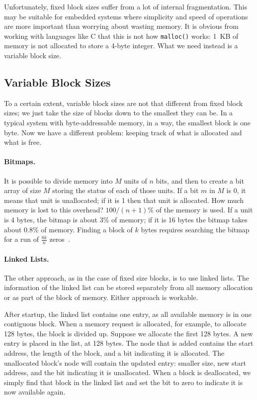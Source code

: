 Unfortunately, fixed block sizes suffer from a lot of internal fragmentation. This may be suitable for embedded systems where simplicity and speed of operations are more important than worrying about wasting memory. It is obvious from working with languages like C that this is not how \texttt{malloc()} works: 1~KB of memory is not allocated to store a 4-byte integer. What we need instead is a variable block size.

\subsection*{Variable Block Sizes}
To a certain extent, variable block sizes are not that different from fixed block sizes; we just take the size of blocks down to the smallest they can be. In a typical system with byte-addressable memory, in a way, the smallest block is one byte. Now we have a different problem: keeping track of what is allocated and what is free.

\paragraph{Bitmaps.} It is possible to divide memory into $M$ units of $n$ bits, and then to create a bit array of size $M$ storing the status of each of those units. If a bit $m$ in $M$ is 0, it means that unit is unallocated; if it is 1 then that unit is allocated. How much memory is lost to this overhead? $100/(n+1)$\% of the memory is used. If a unit is 4 bytes, the bitmap is about 3\% of memory; if it is 16 bytes the bitmap takes about 0.8\% of memory. Finding a block of $k$ bytes requires searching the bitmap for a run of $\frac{8k}{n}$ zeros~\cite{mte241}.

\paragraph{Linked Lists.}
The other approach, as in the case of fixed size blocks, is to use linked lists. The information of the linked list can be stored separately from all memory allocation or as part of the block of memory. Either approach is workable.

After startup, the linked list contains one entry, as all available memory is in one contiguous block. When a memory request is allocated, for example, to allocate 128 bytes, the block is divided up. Suppose we allocate the first 128 bytes. A new entry is placed in the list, at 128 bytes. The node that is added contains the start address, the length of the block, and a bit indicating it is allocated. The unallocated block's node will contain the updated entry: smaller size, new start address, and the bit indicating it is unallocated. When a block is deallocated, we simply find that block in the linked list and set the bit to zero to indicate it is now available again.

